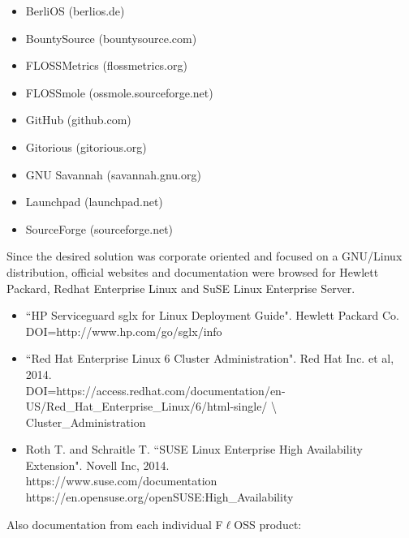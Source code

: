 \documentclass[a4paper, 12pt]{book}
\begin{document}
\begin{itemize}
	\item BerliOS (berlios.de)
	\item BountySource (bountysource.com)
	\item FLOSSMetrics (flossmetrics.org)
	\item FLOSSmole (ossmole.sourceforge.net)
	\item GitHub (github.com)
	\item Gitorious (gitorious.org)
	\item GNU Savannah (savannah.gnu.org)
	\item Launchpad (launchpad.net)
	\item SourceForge (sourceforge.net)
\end{itemize}

\noindent Since the desired solution was corporate oriented and focused on a GNU/Linux distribution, official websites and documentation were browsed for Hewlett Packard, Redhat Enterprise Linux and SuSE Linux Enterprise Server.

\begin{itemize}
	\item ``HP Serviceguard sglx for Linux Deployment Guide". Hewlett Packard Co.\\
	      DOI=http://www.hp.com/go/sglx/info
	\item ``Red Hat Enterprise Linux 6 Cluster Administration". Red Hat Inc. et al, 2014.\\
	      DOI=https://access.redhat.com/documentation/en-US/Red\_Hat\_Enterprise\_Linux/6/html-single/ \textbackslash \\
	      Cluster\_Administration
	\item Roth T. and Schraitle T. ``SUSE Linux Enterprise High Availability Extension". Novell Inc, 2014.\\
	      https://www.suse.com/documentation\\
	      https://en.opensuse.org/openSUSE:High\_Availability
\end{itemize}

\noindent Also documentation from each individual F$\ell$OSS product:
\end{document}
